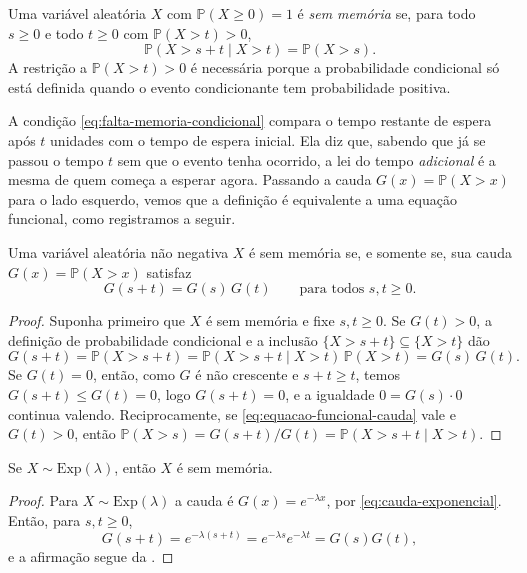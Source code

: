 \begin{definition}\label{def:variavel-sem-memoria}
Uma variável aleatória $X$ com $\mathbb{P}(X\geqslant 0)=1$ é \emph{sem
memória} se, para todo $s\geqslant 0$ e todo $t\geqslant 0$ com
$\mathbb{P}(X>t)>0$,
\begin{equation}\label{eq:falta-memoria-condicional}
  \mathbb{P}(X>s+t\mid X>t)=\mathbb{P}(X>s).
\end{equation}
A restrição a $\mathbb{P}(X>t)>0$ é necessária porque a probabilidade
condicional só está definida quando o evento condicionante tem probabilidade
positiva.
\end{definition}

A condição \eqref{eq:falta-memoria-condicional} compara o tempo restante de
espera após $t$ unidades com o tempo de espera inicial. Ela diz que, sabendo
que já se passou o tempo $t$ sem que o evento tenha ocorrido, a lei do tempo
\emph{adicional} é a mesma de quem começa a esperar agora. Passando a cauda
$G(x)=\mathbb{P}(X>x)$ para o lado esquerdo, vemos que a definição é
equivalente a uma equação funcional, como registramos a seguir.

\begin{proposition}\label{prop:falta-memoria-equacao}
Uma variável aleatória não negativa $X$ é sem memória se, e somente se, sua
cauda $G(x)=\mathbb{P}(X>x)$ satisfaz
\begin{equation}\label{eq:equacao-funcional-cauda}
  G(s+t)=G(s)\,G(t)
  \qquad\text{para todos } s,t\geqslant 0.
\end{equation}
\end{proposition}
\begin{proof}
Suponha primeiro que $X$ é sem memória e fixe $s,t\geqslant 0$. Se
$G(t)>0$, a definição de probabilidade condicional e a inclusão
$\{X>s+t\}\subseteq\{X>t\}$ dão
\[
  G(s+t)=\mathbb{P}(X>s+t)
  =\mathbb{P}(X>s+t\mid X>t)\,\mathbb{P}(X>t)
  =G(s)\,G(t).
\]
Se $G(t)=0$, então, como $G$ é não crescente e $s+t\geqslant t$, temos
$G(s+t)\leqslant G(t)=0$, logo $G(s+t)=0$, e a igualdade $0=G(s)\cdot 0$
continua valendo. Reciprocamente, se \eqref{eq:equacao-funcional-cauda} vale
e $G(t)>0$, então
$\mathbb{P}(X>s)=G(s+t)/G(t)=\mathbb{P}(X>s+t\mid X>t)$.
\end{proof}

\begin{proposition}\label{prop:exponencial-sem-memoria}
Se $X\sim\mathrm{Exp}(\lambda)$, então $X$ é sem memória.
\end{proposition}
\begin{proof}
Para $X\sim\mathrm{Exp}(\lambda)$ a cauda é $G(x)=e^{-\lambda x}$, por
\eqref{eq:cauda-exponencial}. Então, para $s,t\geqslant 0$,
\[
  G(s+t)=e^{-\lambda(s+t)}=e^{-\lambda s}e^{-\lambda t}=G(s)G(t),
\]
e a afirmação segue da .
\end{proof}

